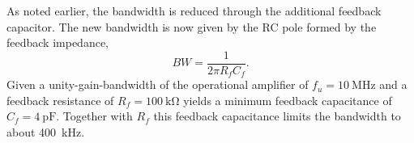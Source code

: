 As noted earlier, the bandwidth is reduced through the additional feedback capacitor.
The new bandwidth is now given by the RC pole formed by the feedback impedance,
\begin{equation}
	BW=\frac{1}{2\pi R_fC_f}.
\end{equation}
Given a unity-gain-bandwidth of the operational amplifier of $f_u=\SI{10}{\mega\hertz}$ and a feedback resistance of $R_f=\SI{100}{\kilo\ohm}$  yields a minimum feedback capacitance of $C_f=\SI{4}{\pico\farad}$.
Together with $R_f$ this feedback capacitance limits the bandwidth to about \SI{400}{\kilo\hertz}.


